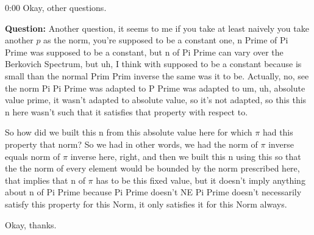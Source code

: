 \begin{unfinished}{0:00}
Okay, other questions. 

\textbf{Question:} Another question, it seems to me if you take at least naively you take another $p$ as the norm, you're supposed to be a constant one, n Prime of Pi Prime was supposed to be a constant, but n of Pi Prime can vary over the Berkovich Spectrum, but uh, I think with supposed to be a constant because is small than the normal Prim Prim inverse the same was it to be. Actually, no, see the norm Pi Pi Prime was adapted to P Prime was adapted to um, uh, absolute value prime, it wasn't adapted to absolute value, so it's not adapted, so this this n here wasn't such that it satisfies that property with respect to.

So how did we built this n from this absolute value here for which $\pi$ had this property that norm? So we had in other words, we had the norm of $\pi$ inverse equals norm of $\pi$ inverse here, right, and then we built this n using this so that the the norm of every element would be bounded by the norm prescribed here, that implies that n of $\pi$ has to be this fixed value, but it doesn't imply anything about n of Pi Prime because Pi Prime doesn't NE Pi Prime doesn't necessarily satisfy this property for this Norm, it only satisfies it for this Norm always.

Okay, thanks.

\end{unfinished}